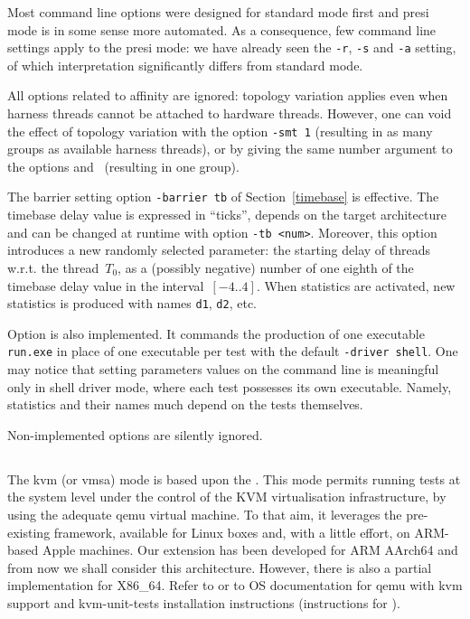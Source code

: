 Most command line options were designed for standard mode first and presi mode
is in some sense more automated. As a consequence, few command line
settings apply to the presi mode: we have already seen
the \texttt{-r}, \texttt{-s} and \texttt{-a} setting, of which interpretation
significantly differs from standard mode.

All options related to affinity are ignored: topology variation
applies even when harness  threads cannot be attached to hardware
threads. However, one can void the effect of topology variation with
the option \texttt{-smt 1} (resulting in as many groups as available
harness threads),  or by giving the same number argument to the
options  and~ (resulting in one group).

The barrier setting option \texttt{-barrier tb} of
Section~\ref{timebase} is effective. The  timebase delay value
is expressed in ``ticks'', depends on the target architecture and can
be changed at runtime with option \texttt{-tb <num>}.  Moreover, this
option introduces a new randomly selected parameter: the starting delay
of threads w.r.t. the thread~$T_0$,
as a (possibly negative) number of one eighth of the timebase delay
value in the interval~$[-4..4]$.
When statistics are activated, new statistics is produced with names
\texttt{d1}, \texttt{d2}, etc.

Option  is also implemented. It
commands the production of one executable \texttt{run.exe} in place
of one executable per test with the default \texttt{-driver shell}.
One may notice that setting parameters values on the command line
is meaningful only in shell driver mode, where each test possesses
its own executable. Namely, statistics and their names much
depend on the tests themselves.

Non-implemented options are silently ignored.


\subsection{}
The kvm (or vmsa) mode is based upon the .
This mode permits running tests at the system level under the
control of the KVM virtualisation infrastructure, by using the adequate
qemu virtual machine. To that aim, it leverages the
pre-existing 
framework, available for Linux boxes and, with a little effort, on
ARM-based Apple machines. Our extension has been developed for ARM
AArch64 and from now we shall consider this  architecture. However,
there is also a partial implementation for X86\_64. Refer to
or to OS documentation for qemu with kvm support and kvm-unit-tests
installation instructions (instructions
for ).

